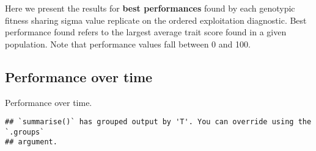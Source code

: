 \documentclass[]{book}
\newenvironment{Shaded}{\begin{snugshade}}{\end{snugshade}}
\newcommand{\DataTypeTok}[1]{\textcolor[rgb]{0.13,0.29,0.53}{#1}}
\newcommand{\KeywordTok}[1]{\textcolor[rgb]{0.13,0.29,0.53}{\textbf{#1}}}
\newcommand{\NormalTok}[1]{#1}
\newcommand{\OperatorTok}[1]{\textcolor[rgb]{0.81,0.36,0.00}{\textbf{#1}}}
\newcommand{\StringTok}[1]{\textcolor[rgb]{0.31,0.60,0.02}{#1}}
\begin{document}
Here we present the results for \textbf{best performances} found by each genotypic fitness sharing sigma value replicate on the ordered exploitation diagnostic.
Best performance found refers to the largest average trait score found in a given population.
Note that performance values fall between 0 and 100.

\hypertarget{performance-over-time-6}{%
\subsection{Performance over time}\label{performance-over-time-6}}

Performance over time.

\begin{Shaded}
\end{Shaded}

\begin{verbatim}
## `summarise()` has grouped output by 'T'. You can override using the `.groups`
## argument.
\end{verbatim}
\end{document}
